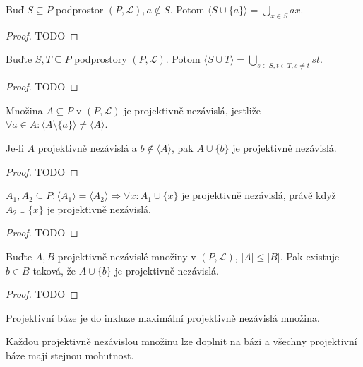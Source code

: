 \begin{lemma}
    Buď $S\subseteq P$ podprostor $(P,\mathcal{L}), a\not\in S$.
    Potom $\langle S\cup\{a\}\rangle=\bigcup_{x\in S}ax$.
\end{lemma}
\begin{proof}
    TODO
\end{proof}
\begin{lemma}
    Buďte $S,T\subseteq P$ podprostory $(P,\mathcal{L})$.
    Potom $\langle S\cup T\rangle=\bigcup_{s\in S, t\in T, s\neq t}st$.
\end{lemma}
\begin{proof}
    TODO
\end{proof}
\begin{definition}
    Množina $A\subseteq P$ v $(P,\mathcal{L})$ je projektivně nezávislá, jestliže $\forall a\in A: \langle A\setminus \{a\}\rangle\neq\langle A\rangle$.
\end{definition}
\begin{lemma}
    Je-li $A$ projektivně nezávislá a $b\not\in\langle A\rangle$, pak $A\cup\{b\}$ je projektivně nezávislá.
\end{lemma}
\begin{proof}
    TODO
\end{proof}
\begin{note}
    $A_1,A_2\subseteq P: \langle A_1\rangle=\langle A_2\rangle\Rightarrow \forall x: A_1\cup\{x\}$ je projektivně nezávislá, právě když $A_2\cup\{x\}$ je projektivně nezávislá.
\end{note}
\begin{proof}
    TODO
\end{proof}
\begin{theorem}[O výměně]
    Buďte $A,B$ projektivně nezávislé množiny v $(P,\mathcal{L})$, $|A|\leq |B|$.
    Pak existuje $b\in B$ taková, že $A\cup\{b\}$ je projektivně nezávislá.
\end{theorem}
\begin{proof}
    TODO
\end{proof}
\begin{definition}
    Projektivní báze je do inkluze maximální projektivně nezávislá množina.
\end{definition}
\begin{consequence}
    Každou projektivně nezávislou množinu lze doplnit na bázi a všechny projektivní báze mají stejnou mohutnost.
\end{consequence}
